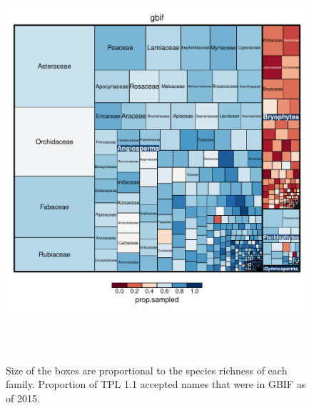 \documentclass[a4paper,11pt]{article}
\begin{document}
\begin{figure}[h!]
\centering
\includegraphics[width=15cm,height=15cm,keepaspectratio]{figures/treemap_gbif.pdf}
\caption{Size of the boxes are proportional to the species richness of each family.  Proportion of TPL 1.1 accepted names that were in GBIF as of 2015.  }
\label{fig:gbif_treemap}
\end{figure}
\clearpage
\end{document}
